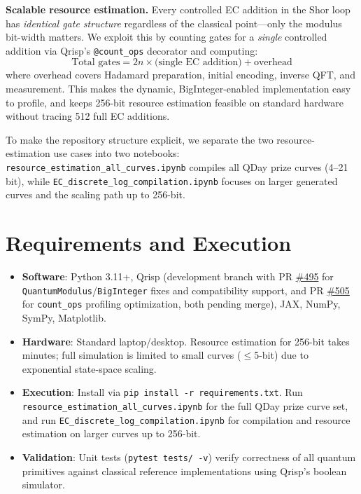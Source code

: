 \documentclass[11pt,a4paper]{article}
\begin{document}
\textbf{Scalable resource estimation.}  
Every controlled EC addition in the Shor loop has \emph{identical gate structure} regardless of the classical point---only the modulus bit-width matters. We exploit this by counting gates for a \emph{single} controlled addition via Qrisp's \texttt{@count\_ops} decorator and computing:
\[
\text{Total gates} = 2n \times \text{(single EC addition)} + \text{overhead}
\]
where overhead covers Hadamard preparation, initial encoding, inverse QFT, and measurement. This makes the dynamic, BigInteger-enabled implementation easy to profile, and keeps 256-bit resource estimation feasible on standard hardware without tracing 512 full EC additions.

To make the repository structure explicit, we separate the two resource-estimation use cases into two notebooks: \texttt{resource\_estimation\_all\_curves.ipynb} compiles all QDay prize curves (4--21 bit), while \texttt{EC\_discrete\_log\_compilation.ipynb} focuses on larger generated curves and the scaling path up to 256-bit.

\section*{Requirements and Execution}

\begin{itemize}[nosep,leftmargin=1.2em]
    \item \textbf{Software}: Python 3.11+, Qrisp (development branch with PR \href{https://github.com/eclipse-qrisp/qrisp/pull/495}{\#495} for \texttt{QuantumModulus}/\texttt{BigInteger} fixes and compatibility support, and PR \href{https://github.com/eclipse-qrisp/qrisp/pull/505}{\#505} for \texttt{count\_ops} profiling optimization, both pending merge), JAX, NumPy, SymPy, Matplotlib.
    \item \textbf{Hardware}: Standard laptop/desktop. Resource estimation for 256-bit takes minutes; full simulation is limited to small curves ($\leq$5-bit) due to exponential state-space scaling.
    \item \textbf{Execution}: Install via \texttt{pip install -r requirements.txt}. Run \texttt{resource\_estimation\_all\_curves.ipynb} for the full QDay prize curve set, and run \texttt{EC\_discrete\_log\_compilation.ipynb} for compilation and resource estimation on larger curves up to 256-bit.
    \item \textbf{Validation}: Unit tests (\texttt{pytest tests/ -v}) verify correctness of all quantum primitives against classical reference implementations using Qrisp's boolean simulator.
\end{itemize}
\end{document}
